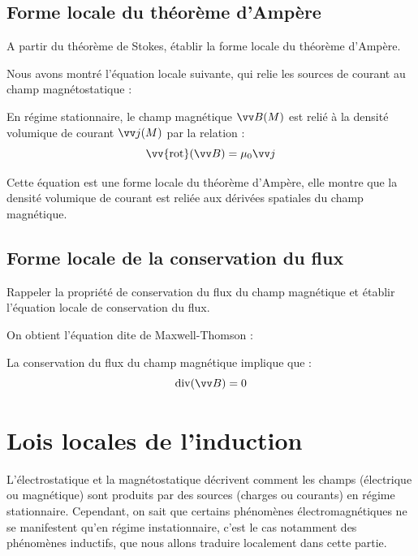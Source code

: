 \documentclass[11pt,fleqn]{book} %
\renewcommand{\div}{\mathrm{div}}
\newcommand{\rot}{\vv{\mathrm{rot}}}
\begin{document}
\subsection{Forme locale du théorème d'Ampère}

\begin{capex}
	A partir du théorème de Stokes, établir la forme locale du théorème d'Ampère.
\end{capex}

Nous avons montré l'équation locale suivante, qui relie les sources de courant au champ magnétostatique :
\begin{proposition}
	En régime stationnaire, le champ magnétique $\vv B(M)$ est relié à la densité volumique de courant $\vv j(M)$ par la relation :
	\begin{equation}
		\rot (\vv B) = \mu_0 \vv j
	\end{equation}
\end{proposition}

Cette équation est une forme locale du théorème d'Ampère, elle montre que la densité volumique de courant est reliée aux dérivées spatiales du champ magnétique.

\subsection{Forme locale de la conservation du flux}

\begin{capex}
	Rappeler la propriété de conservation du flux du champ magnétique et établir l'équation locale de conservation du flux.
\end{capex}

On obtient l'équation dite de Maxwell-Thomson :
\begin{proposition}
	La conservation du flux du champ magnétique implique que :
	\begin{equation}
		\div ( \vv B) = 0
	\end{equation}
\end{proposition}

\section{Lois locales de l'induction}

L'électrostatique et la magnétostatique décrivent comment les champs (électrique ou magnétique) sont produits par des sources (charges ou courants) en régime stationnaire. Cependant, on sait que certains phénomènes électromagnétiques ne se manifestent qu'en régime instationnaire, c'est le cas notamment des phénomènes inductifs, que nous allons traduire localement dans cette partie.
\end{document}
